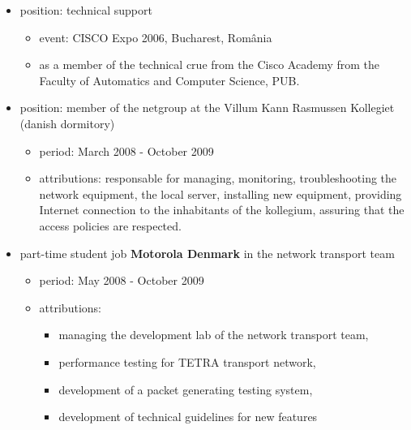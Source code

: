 \documentclass[a4paper,12pt,openany]{article}
\begin{document}
\begin{itemize}
\begin{itemize}
			\end{itemize}
			\item position: technical support 
				\begin{itemize}
				 \item event: CISCO Expo 2006, Bucharest, România
                                 \item as a member of the technical crue from the Cisco Academy from the Faculty of Automatics and Computer Science, PUB.
                                \end{itemize}
			\item position: member of the netgroup at the Villum Kann Rasmussen Kollegiet (danish dormitory)
				\begin{itemize}
					\item period: March 2008 - October 2009 
					\item attributions: responsable for managing, monitoring, troubleshooting the network equipment, the local server, installing new equipment, providing Internet connection to the inhabitants of the kollegium, assuring that the access policies are respected.
				\end{itemize}
			\item part-time student job \textbf{Motorola Denmark} in the network transport team
				\begin{itemize}
					\item period: May 2008 - October 2009
					\item attributions: 
					\begin{itemize}
						\item managing the development lab of the network transport team, 
						\item performance testing for TETRA transport network, 
						\item development of a packet generating testing system, 
						\item development of technical guidelines for new features
					\end{itemize}
				\end{itemize}
		\end{itemize}	
\end{document}
